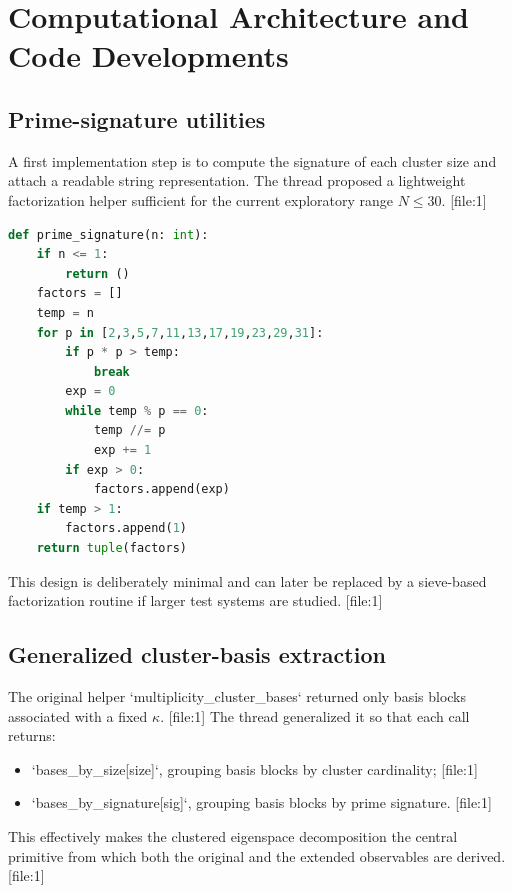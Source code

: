 \documentclass[11pt]{article}
\begin{document}
\section{Computational Architecture and Code Developments}

\subsection{Prime-signature utilities}

A first implementation step is to compute the signature of each cluster size and attach a readable string representation. The thread proposed a lightweight factorization helper sufficient for the current exploratory range $N\le 30$. [file:1]

\begin{lstlisting}[language=Python, caption={Prime-signature helper}]
def prime_signature(n: int):
    if n <= 1:
        return ()
    factors = []
    temp = n
    for p in [2,3,5,7,11,13,17,19,23,29,31]:
        if p * p > temp:
            break
        exp = 0
        while temp % p == 0:
            temp //= p
            exp += 1
        if exp > 0:
            factors.append(exp)
    if temp > 1:
        factors.append(1)
    return tuple(factors)
\end{lstlisting}

This design is deliberately minimal and can later be replaced by a sieve-based factorization routine if larger test systems are studied. [file:1]

\subsection{Generalized cluster-basis extraction}

The original helper `multiplicity_cluster_bases` returned only basis blocks associated with a fixed $\kappa$. [file:1] The thread generalized it so that each call returns:
\begin{itemize}
    \item `bases_by_size[size]`, grouping basis blocks by cluster cardinality; [file:1]
    \item `bases_by_signature[sig]`, grouping basis blocks by prime signature. [file:1]
\end{itemize}

This effectively makes the clustered eigenspace decomposition the central primitive from which both the original and the extended observables are derived. [file:1]
\end{document}
